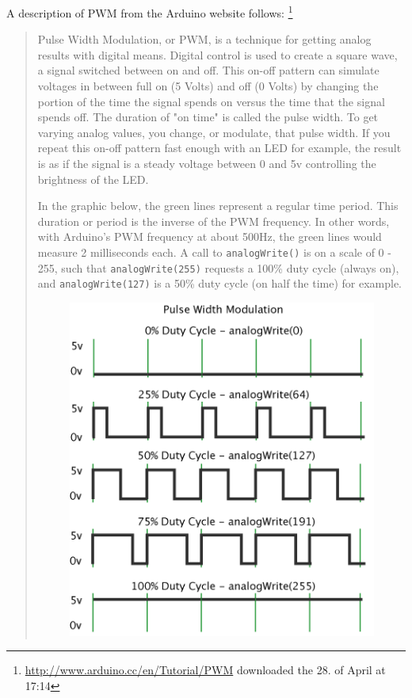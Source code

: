 \documentclass[a4paper,oneside, draft]{memoir}
\begin{document}
A description of PWM from the Arduino website follows:
\footnote{\url{http://www.arduino.cc/en/Tutorial/PWM} downloaded the
  28. of April at 17:14}

\begin{quotation}
  Pulse Width Modulation, or PWM, is a technique for getting analog
  results with digital means. Digital control is used to create a
  square wave, a signal switched between on and off. This on-off
  pattern can simulate voltages in between full on (5 Volts) and off
  (0 Volts) by changing the portion of the time the signal spends on
  versus the time that the signal spends off. The duration of "on
  time" is called the pulse width. To get varying analog values, you
  change, or modulate, that pulse width. If you repeat this on-off
  pattern fast enough with an LED for example, the result is as if the
  signal is a steady voltage between 0 and 5v controlling the
  brightness of the LED.

  In the graphic below, the green lines represent a regular time
  period. This duration or period is the inverse of the PWM
  frequency. In other words, with Arduino's PWM frequency at about
  500Hz, the green lines would measure 2 milliseconds each. A call to
  \texttt{analogWrite()} is on a scale of 0 - 255, such that
  \texttt{analogWrite(255)} requests a 100\% duty cycle (always on),
  and \texttt{analogWrite(127)} is a 50\% duty cycle (on half the
  time) for example.

  
  \begin{figure}[h!]
    \centering
    \includegraphics[scale=0.8]{images/pwm}


\end{figure}
\end{quotation}
\end{document}
